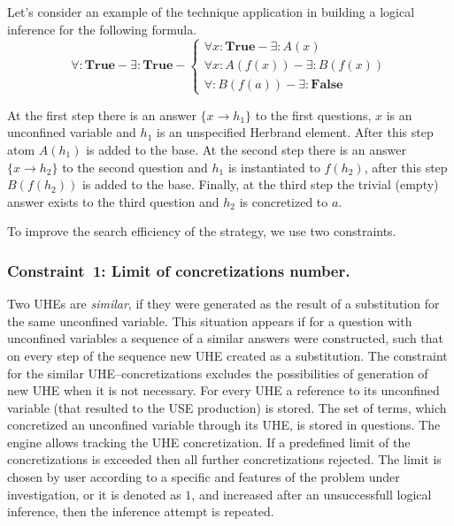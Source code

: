 \documentclass[runningheads,a4paper]{llncs}
\begin{document}
Let's consider an example of the technique application in building a logical inference for the following formula.
\begin{equation*}
  \forall\colon\boldsymbol{True} - \exists\colon\boldsymbol{True} -
  \left\lbrace
  \begin{array}{l}
    \forall x\colon\boldsymbol{True} - \exists\colon A(x) \\
    \forall x\colon A(f(x)) - \exists\colon B(f(x)) \\
    \forall\colon B(f(a)) - \exists\colon \boldsymbol{False}
  \end{array}\right.
\end{equation*}

At the first step there is an answer $\{x \rightarrow h_1\}$ to the first questions, $x$ is an unconfined variable and $h_1$ is an unspecified Herbrand element. After this step atom $A(h_1)$ is added to the base. At the second step there is an answer $\{x \rightarrow h_2\}$ to the second question and $h_1$ is instantiated to $f(h_2)$, after this step $B(f(h_2))$ is added to the base. Finally, at the third step the trivial (empty) answer exists to the third question and $h_2$ is concretized to $a$.

To improve the search efficiency of the strategy, we use two constraints.

\subsubsection{Constraint~1: Limit of concretizations number.}

Two UHEs are \emph{similar}, if they were generated as the result of a substitution for the same unconfined variable. This situation appears if for a question with unconfined variables a sequence of a similar answers were constructed, such that on every step of the sequence new UHE created as a substitution. The constraint for the similar UHE--concretizations excludes the possibilities of generation of new UHE when it is not necessary. For every UHE a reference to its unconfined variable (that resulted to the USE production) is stored. The set of terms, which concretized an unconfined variable through its UHE, is stored in questions. The engine allows tracking the UHE concretization. If a predefined limit of the concretizations is exceeded then all further concretizations rejected. The limit is chosen by user according to a specific and features of the problem under investigation, or it is denoted as $1$, and increased after an unsuccessfull logical inference, then the inference attempt is repeated.
\end{document}

